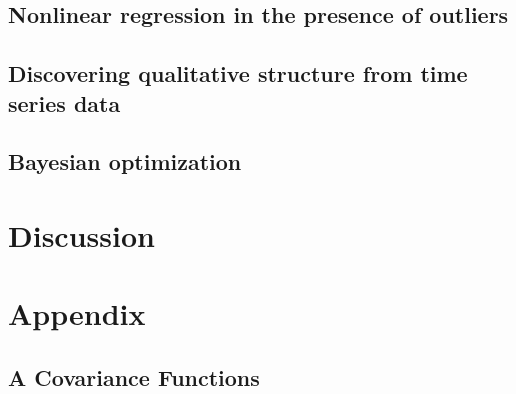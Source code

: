 \documentclass[twoside,11pt]{article}
\newcommand{\gpmem}{\texttt{gpmem}}
\begin{document}
\subsection{Nonlinear regression in the presence of outliers}

%
\subsection{Discovering qualitative structure from time series data}\label{sec:structurelearning}


\subsection{Bayesian optimization}

\label{sec:thompson}




%
%
%
\section{Discussion}


\newpage
\section*{Appendix}
\subsection*{A Covariance Functions}

\end{document}
